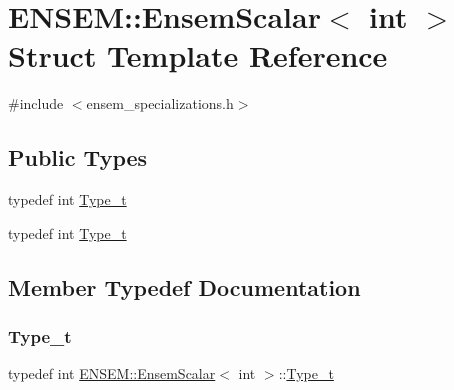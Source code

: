 \hypertarget{structENSEM_1_1EnsemScalar_3_01int_01_4}{}\section{E\+N\+S\+EM\+:\+:Ensem\+Scalar$<$ int $>$ Struct Template Reference}
\label{structENSEM_1_1EnsemScalar_3_01int_01_4}


{\ttfamily \#include $<$ensem\+\_\+specializations.\+h$>$}

\subsection*{Public Types}
\begin{DoxyCompactItemize}
\item 
typedef int \mbox{\hyperlink{structENSEM_1_1EnsemScalar_3_01int_01_4_a41810484239c9a09218b0ca99828cd0a}{Type\+\_\+t}}
\item 
typedef int \mbox{\hyperlink{structENSEM_1_1EnsemScalar_3_01int_01_4_a41810484239c9a09218b0ca99828cd0a}{Type\+\_\+t}}
\end{DoxyCompactItemize}


\subsection{Member Typedef Documentation}
\mbox{\label{structENSEM_1_1EnsemScalar_3_01int_01_4_a41810484239c9a09218b0ca99828cd0a}} 
\subsubsection{\texorpdfstring{Type\_t}{Type\_t}\hspace{0.1cm}{\footnotesize\ttfamily [1/2]}}
{\footnotesize\ttfamily typedef int \mbox{\hyperlink{structENSEM_1_1EnsemScalar}{E\+N\+S\+E\+M\+::\+Ensem\+Scalar}}$<$ int $>$\+::\mbox{\hyperlink{structENSEM_1_1EnsemScalar_3_01int_01_4_a41810484239c9a09218b0ca99828cd0a}{Type\+\_\+t}}}

\mbox{\label{structENSEM_1_1EnsemScalar_3_01int_01_4_a41810484239c9a09218b0ca99828cd0a}} 

